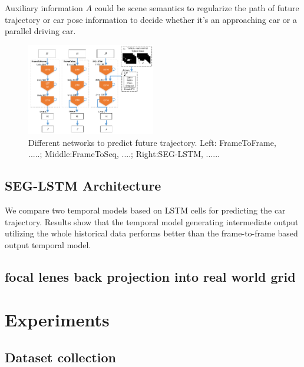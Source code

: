 \documentclass[10pt,twocolumn,letterpaper]{article}
\begin{document}
Auxiliary information $A$ could be scene semantics to regularize the path of future trajectory or car pose information to decide whether it's an approaching car or a parallel driving car.


\begin{figure}[t]
        \centering
        \includegraphics[width=0.5\textwidth]{figures/network_detail.pdf}
        \caption{ {\small Different networks to predict future trajectory. Left: FrameToFrame, .....; Middle:FrameToSeq, ....; Right:SEG-LSTM, ......}}
        \label{fig:dataset}
\end{figure}
\subsection{SEG-LSTM Architecture}


We compare two temporal models based on LSTM cells for predicting the car trajectory.
Results show that the temporal model generating intermediate output utilizing the whole historical data performs better than the frame-to-frame based output temporal model.





\subsection{focal lenes back projection into real world grid}



\section{Experiments}

\subsection{Dataset collection}
\end{document}
